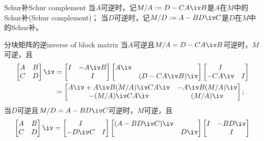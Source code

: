 \begin{definition}
	{Schur补}{Schur complement}
	当$A$可逆时，记$M/A:=D-CA\iv B$是$A$在$M$中的Schur补(Schur complement)；
	当$D$可逆时，记$M/D:=A-BD\iv C$是$D$在$M$中的Schur补。
\end{definition}

\begin{theorem}
	{分块矩阵的逆}{inverse of block matrix}
	当$A$可逆且$M/A=D-CA\iv B$可逆时，$M$可逆，且
	\begin{subequations}
		\begin{align}
			\begin{bmatrix}
				A&B\\C&D
			\end{bmatrix}\iv&=\begin{bmatrix}
				I&-A\iv B\\ &I
			\end{bmatrix}\begin{bmatrix}
				A\iv\\ &(D-CA\iv B)\iv
			\end{bmatrix}\begin{bmatrix}
				I\\-CA\iv&I
			\end{bmatrix}\\
			\label{eqn:[AB;CD]-1=M/A}
			&=\begin{bmatrix}
				A\iv+A\iv B(M/A)\iv CA\iv&-A\iv B(M/A)\iv\\
				-(M/A)\iv CA\iv&(M/A)\iv
			\end{bmatrix};
		\end{align}
	\end{subequations}
	当$D$可逆且$M/D=A-BD\iv C$可逆时，$M$可逆，且
	\begin{subequations}
		\begin{align}
			\begin{bmatrix}
				A&B\\C&D
			\end{bmatrix}\iv&=\begin{bmatrix}
				I\\-D\iv C&I
			\end{bmatrix}\begin{bmatrix}
				(A-BD\iv C)\iv\\ &D\iv
			\end{bmatrix}\begin{bmatrix}
				I&-BD\iv\\ &I
			\end{bmatrix}\\
			\label{eqn:[AB;CD]-1=M/D}

\end{align}
\end{subequations}
\end{theorem}

